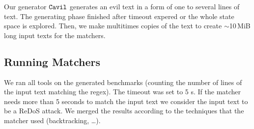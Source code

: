 \documentclass[acmsmall,screen]{acmart}
\begin{document}
Our generator $\texttt{Cavil}$ generates an evil text in a form of one to several lines of text. 
%
The generating phase finished after timeout expered or the whole state space is explored.
%
Then, we make multitimes copies of the text to create $\sim$10\,MiB long
 input texts for the matchers.



\subsection{Running Matchers}
We ran all tools on the generated benchmarks (counting the number of lines of
the input text matching the regex).
%
The timeout was set to 5 s. If the matcher needs more than 5 seconds to match the input text
%
we consider the input text to be a ReDoS attack.
%
We merged the results according to the techniques that the matcher used (backtracking, \dots).
%


\end{document}
